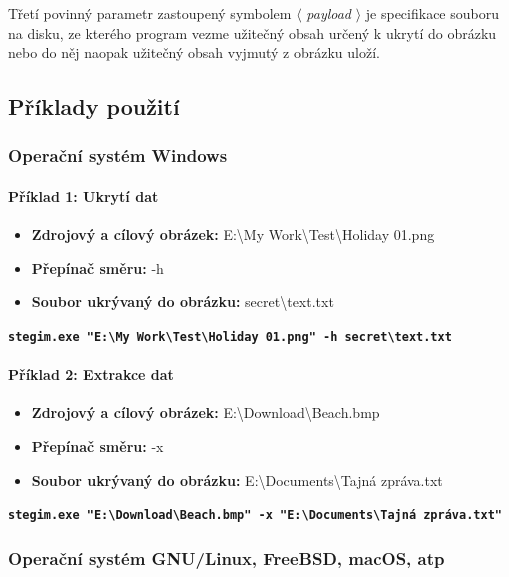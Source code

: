 \documentclass[12pt]{report}
\begin{document}
    Třetí povinný parametr zastoupený symbolem $\langle$ \textit{payload} $\rangle$ je specifikace souboru na disku, ze kterého program vezme užitečný obsah určený k ukrytí do obrázku nebo do něj naopak užitečný obsah vyjmutý z obrázku uloží.

    \subsection{Příklady použití}

    \subsubsection{Operační systém Windows}

    \paragraph{Příklad 1: Ukrytí dat}
    \begin{itemize}
        \item \textbf{Zdrojový a cílový obrázek:} E:\textbackslash My Work\textbackslash Test\textbackslash Holiday 01.png
        \item \textbf{Přepínač směru:} -h
        \item \textbf{Soubor ukrývaný do obrázku:} secret\textbackslash text.txt
    \end{itemize}
     \texttt{\textbf{stegim.exe "E:\textbackslash My Work\textbackslash Test\textbackslash Holiday 01.png" -h secret\textbackslash text.txt}}

    \paragraph{Příklad 2: Extrakce dat}
    \begin{itemize}
        \item \textbf{Zdrojový a cílový obrázek:} E:\textbackslash Download\textbackslash Beach.bmp
        \item \textbf{Přepínač směru:} -x
        \item \textbf{Soubor ukrývaný do obrázku:} E:\textbackslash Documents\textbackslash Tajná zpráva.txt
    
    \end{itemize}
    \texttt{\textbf{stegim.exe "E:\textbackslash Download\textbackslash Beach.bmp" -x "E:\textbackslash Documents\textbackslash Tajná zpráva.txt"}}

    \subsubsection{Operační systém GNU/Linux, FreeBSD, macOS, atp}
\end{document}
